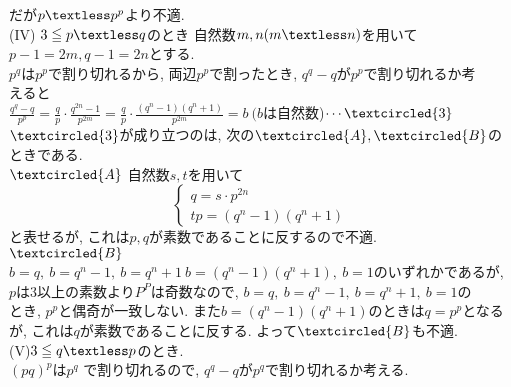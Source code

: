\documentclass{article}
\begin{document}
だが$p\textless p^p$より不適.\vspace{0.2in}\\
(IV) $3\leqq p\textless q$のとき\vspace{0.1in}
自然数$m,n(m\textless n)$を用いて$p-1=2m, q-1=2n$とする.\vspace{0.1in}\\
$p^q$は$p^p$で割り切れるから, 両辺$p^p$で割ったとき, $q^q-q$が$p^p$で割り切れるか考\vspace{0.1in}\\
えると\vspace{0.1in}\\
$\frac{q^q-q}{p^p}=\frac{q}{p}\cdot \frac{q^{2n}-1}{p^{2m}}=\frac{q}{p}\cdot \frac{(q^n-1)(q^n+1)}{p^{2m}}=b\ (b$は自然数)$\cdots \textcircled{3}$ \vspace{0.1in}\\
$\textcircled{3}$が成り立つのは, 次の$\textcircled{A},\textcircled{B}$のときである.\vspace{0.1in}\\
$\textcircled{A}$\hspace{0.1in} 自然数$s,t$を用いて
\begin{displaymath}
\left\{
\begin{array}{l}
q=s\cdot p^{2n} \\
tp=(q^n-1)(q^n+1)
\end{array}
\right.
\end{displaymath}
と表せるが, これは$p,q$が素数であることに反するので不適.\vspace{0.1in}\\
$\textcircled{B}$\vspace{0.1in}\\
$b=q,\ b=q^n-1,\ b=q^n+1\ b=(q^n-1)(q^n+1),\ b=1$のいずれかであるが,\vspace{0.1in}\\
 $p$は$3$以上の素数より$P^P$は奇数なので, $b=q,\ b=q^n-1,\ b=q^n+1,\ b=1$の\vspace{0.1in}\\
 とき, $p^p$と偶奇が一致しない. また$b=(q^n-1)(q^n+1)$のときは$q=p^p$となる\vspace{0.1in}\\
 が, これは$q$が素数であることに反する. よって$\textcircled{B}$も不適.\vspace{0.1in}\\
 (V)$3\leqq q\textless p$のとき.\vspace{0.1in}\\
 $(pq)^p$は$p^q$ で割り切れるので, $q^q-q$が$p^q$で割り切れるか考える.\vspace{0.1in}\\
\end{document}
